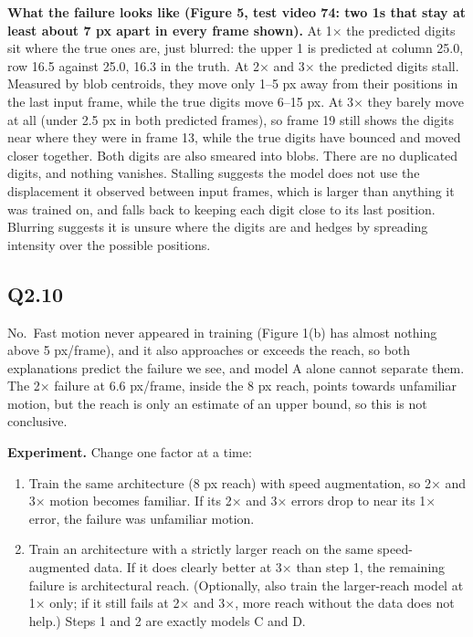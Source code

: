 \documentclass[11pt]{article}
\begin{document}
\textbf{What the failure looks like (Figure 5, test video 74: two 1s that stay at least about 7 px apart in every frame shown).} At 1× the predicted digits sit where the true ones are, just blurred: the upper 1 is predicted at column 25.0, row 16.5 against 25.0, 16.3 in the truth. At 2× and 3× the predicted digits stall. Measured by blob centroids, they move only 1--5 px away from their positions in the last input frame, while the true digits move 6--15 px. At 3× they barely move at all (under 2.5 px in both predicted frames), so frame 19 still shows the digits near where they were in frame 13, while the true digits have bounced and moved closer together. Both digits are also smeared into blobs. There are no duplicated digits, and nothing vanishes. Stalling suggests the model does not use the displacement it observed between input frames, which is larger than anything it was trained on, and falls back to keeping each digit close to its last position. Blurring suggests it is unsure where the digits are and hedges by spreading intensity over the possible positions.


\subsection*{Q2.10}
No.~Fast motion never appeared in training (Figure 1(b) has almost nothing above 5 px/frame), and it also approaches or exceeds the reach, so both explanations predict the failure we see, and model A alone cannot separate them. The 2× failure at 6.6 px/frame, inside the 8 px reach, points towards unfamiliar motion, but the reach is only an estimate of an upper bound, so this is not conclusive.

\textbf{Experiment.} Change one factor at a time:

\begin{enumerate}
\def\labelenumi{\arabic{enumi}.}
\item
  Train the same architecture (8 px reach) with speed augmentation, so 2× and 3× motion becomes familiar. If its 2× and 3× errors drop to near its 1× error, the failure was unfamiliar motion.
\item
  Train an architecture with a strictly larger reach on the same speed-augmented data. If it does clearly better at 3× than step 1, the remaining failure is architectural reach.
  (Optionally, also train the larger-reach model at 1× only; if it still fails at 2× and 3×, more reach without the data does not help.) Steps 1 and 2 are exactly models C and D.
\end{enumerate}
\end{document}
